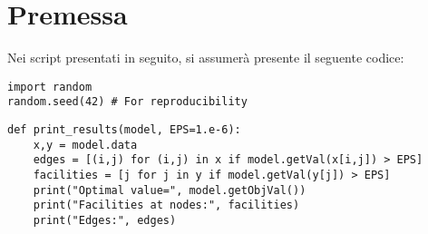 \documentclass[\main/main.tex]{subfiles}
\begin{document}
\chapter{Premessa}
Nei script presentati in seguito, si assumerà presente il seguente codice:

\begin{verbatim}
import random
random.seed(42) # For reproducibility
\end{verbatim}

\begin{verbatim}
def print_results(model, EPS=1.e-6):
    x,y = model.data
    edges = [(i,j) for (i,j) in x if model.getVal(x[i,j]) > EPS]
    facilities = [j for j in y if model.getVal(y[j]) > EPS]
    print("Optimal value=", model.getObjVal())
    print("Facilities at nodes:", facilities)
    print("Edges:", edges)
\end{verbatim}
\end{document}
